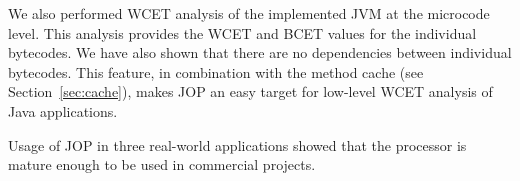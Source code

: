 We also performed WCET analysis of the implemented JVM at the
microcode level. This analysis provides the WCET and BCET values for
the individual bytecodes. We have also shown that there are no
dependencies between individual bytecodes. This feature, in
combination with the method cache (see Section~\ref{sec:cache}),
makes JOP an easy target for low-level WCET analysis of Java
applications.

Usage of JOP in three real-world applications showed that the
processor is mature enough to be used in commercial projects.


%
%
%
